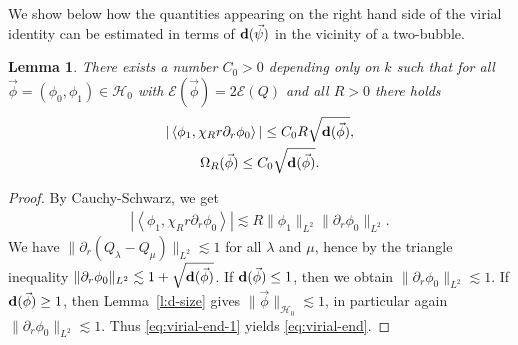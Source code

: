 \documentclass[10pt,reqno]{amsart}
\newcommand{\E}{\mathcal{E}}
\newcommand{\HH}{\mathcal{H}}
\newcommand{\ang}[1]{\left\langle{#1}\right\rangle}
\newcommand{\EQ}[1]{\begin{equation}\begin{split} #1 \end{split}\end{equation}}
\numberwithin{equation}{section}
\newtheorem{lem}[thm]{Lemma}
\theoremstyle{remark}
\newcommand{\0}{\emptyset}
\newcommand{\bfd}{{\bf d}}
\begin{document}
  We show below how the quantities appearing on the right hand side of the virial identity can be estimated in terms of $\bfd(\vec \psi)$
 in the vicinity of a two-bubble.
 \begin{lem}\label{l:error-estim}
 There exists a number $C_0 > 0$ depending only on $k$ such that for all $\vec \phi = (\phi_0, \phi_1) \in \HH_0$ with $\E(\vec\phi) = 2\E(Q)$
 and all $R > 0$ there holds
 \begin{gather}
 |\ang{\phi_1, \chi_R r\partial_r \phi_0}| \leq C_0 R \sqrt{\bfd(\vec \phi)}, \label{eq:virial-end} \\
 \Omega_R(\vec \phi) \leq C_0 \sqrt{\bfd(\vec \phi)}. \label{eq:virial-err}
 \end{gather}
 \end{lem}
 \begin{proof}
 By Cauchy-Schwarz, we get
 \EQ{
 |\ang{\phi_1, \chi_R r\partial_r \phi_0}| \lesssim R \|\phi_1\|_{L^2}\|\partial_r \phi_0\|_{L^2}. \label{eq:virial-end-1}
 }
 We have $\|\partial_r(Q_\lambda - Q_\mu)\|_{L^2} \lesssim 1$ for all $\lambda$ and $\mu$, hence by the triangle inequality
 $\|\partial_r \phi_0\|_{L^2} \lesssim 1 + \sqrt{\bfd(\vec \phi)}$. If $\bfd(\vec\phi) \leq 1$, then we obtain $\|\partial_r \phi_0\|_{L^2} \lesssim 1$.
 If $\bfd(\vec \phi) \geq 1$, then Lemma~\ref{l:d-size} gives $\|\vec\phi\|_{\HH_0} \lesssim 1$,
 in particular again $\|\partial_r \phi_0\|_{L^2} \lesssim 1$. Thus \eqref{eq:virial-end-1} yields \eqref{eq:virial-end}.
 

\end{proof}
\end{document}
